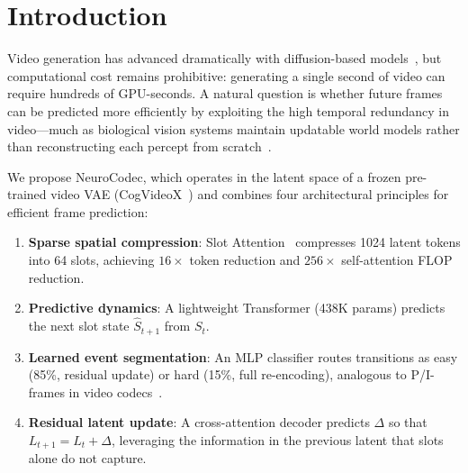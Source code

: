 \documentclass{article}
\newcommand{\method}{NeuroCodec}
\begin{document}
\section{Introduction}
\label{sec:intro}

Video generation has advanced dramatically with diffusion-based
models~\cite{ho2022video,blattmann2023svd,yang2024cogvideox}, but
computational cost remains prohibitive: generating a single second of
video can require hundreds of GPU-seconds.
A natural question is whether future frames can be predicted more
efficiently by exploiting the high temporal redundancy in video---much
as biological vision systems maintain updatable world models rather
than reconstructing each percept from
scratch~\cite{rao1999predictive,friston2005theory}.

We propose \method{}, which operates in the latent space of a frozen
pre-trained video VAE (CogVideoX~\cite{yang2024cogvideox}) and combines
four architectural principles for efficient frame prediction:

\begin{enumerate}
\item \textbf{Sparse spatial compression}: Slot
  Attention~\cite{locatello2020object} compresses 1024 latent tokens
  into 64 slots, achieving $16\times$ token reduction and $256\times$
  self-attention FLOP reduction.

\item \textbf{Predictive dynamics}: A lightweight Transformer
  (438K params) predicts the next slot state $\hat{S}_{t+1}$ from
  $S_t$.

\item \textbf{Learned event segmentation}: An MLP classifier routes
  transitions as easy (85\%, residual update) or hard (15\%, full
  re-encoding), analogous to P/I-frames in video
  codecs~\cite{wiegand2003h264}.

\item \textbf{Residual latent update}: A cross-attention decoder
  predicts $\Delta$ so that $L_{t+1} = L_t + \Delta$, leveraging the
  information in the previous latent that slots alone do not capture.
\end{enumerate}
\end{document}
